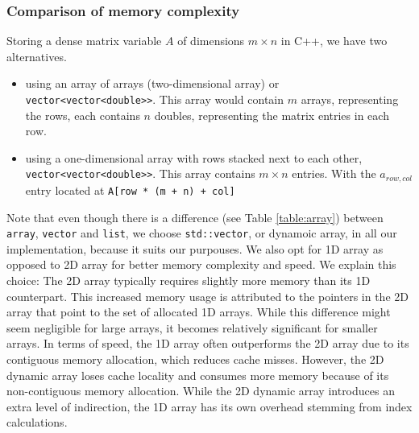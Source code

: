 \subsubsection{Comparison of memory complexity}
Storing a dense matrix variable \( A \) of dimensions \( m \times n \) in C++, we have two alternatives.
\begin{itemize}
    \item using an array of arrays (two-dimensional array) or \texttt{vector<vector<double>>}. This array would contain
          $m$ arrays, representing the rows, each contains $n$ doubles, representing the matrix entries in each row.
    \item using a one-dimensional array with rows stacked next to each other, \texttt{vector<vector<double>>}. This
          array contains $m \times n$ entries. With the $a_{row,col}$ entry located at \texttt{A[row * (m + n) + col]}
\end{itemize}
Note that even
though there is a difference (see Table \ref{table:array}) between  \texttt{array}, \texttt{vector} and \texttt{list}, we
choose \texttt{std::vector}, or dynamoic array, in all our implementation, because it suits our purpouses.
We also opt for 1D array as opposed to 2D array for better memory complexity and speed.
We explain this choice:
The 2D array typically requires slightly more memory than its 1D counterpart.
This increased memory usage is attributed to the pointers in the 2D array that point to
the set of allocated 1D arrays. While this difference might seem negligible for large arrays,
it becomes relatively significant for smaller arrays. In terms of speed, the 1D array often outperforms
the 2D array due to its contiguous memory allocation, which reduces cache misses.
However, the 2D dynamic array loses cache locality and consumes more memory because of its non-contiguous
memory allocation. While the 2D dynamic array introduces an
extra level of indirection, the 1D array has its own overhead stemming from index calculations.
